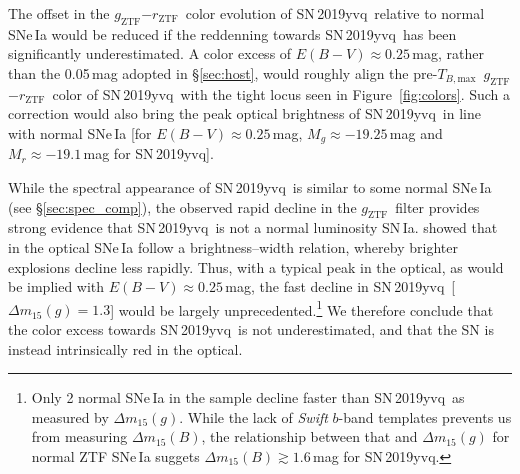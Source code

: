 \documentclass[twocolumn]{aastex63}
\newcommand{\fromkate}[1]{{\color{brown} fromKM: {#1}}}
\newcommand{\frommb}[1]{{\color{purple} fromMB: {#1}}}
\newcommand{\rztf}{$r_\mathrm{ZTF}$}
\newcommand{\gztf}{$g_\mathrm{ZTF}$}
\newcommand{\tbmax}{$T_{B,\mathrm{max}}$}
\newcommand{\sn}{SN\,2019yvq}
\begin{document}
The offset in the \gztf$ - $\rztf\ color evolution of \sn\ relative to normal
SNe\,Ia would be reduced if the reddenning towards \sn\ has been significantly
underestimated. A color excess of $E(B-V) \approx 0.25$\,mag, rather than the
0.05\,mag adopted in \S\ref{sec:host}, would roughly align the pre-\tbmax\
\gztf$ - $\rztf\ color of \sn\ with the tight locus seen in
Figure~\ref{fig:colors}. Such a correction would also bring the peak optical
brightness of \sn\ in line with normal SNe\,Ia [for $E(B-V) \approx
0.25$\,mag, $M_g \approx -19.25$\,mag and $M_r \approx -19.1$\,mag for \sn].

While the spectral appearance of \sn\ is similar to some normal SNe\,Ia (see
\S\ref{sec:spec_comp}), the observed rapid decline in the \gztf\ filter
provides strong evidence that \sn\ is not a normal luminosity SN\,Ia.
\citet{Phillips93} showed that in the optical SNe\,Ia follow a
brightness--width relation, whereby brighter explosions decline less rapidly.
Thus, with a typical peak in the optical, as would be implied with $E(B-V)
\approx 0.25$\,mag, the fast decline in \sn\ [$\Delta m_{15}(g) = 1.3$] would
be largely unprecedented.\footnote{Only 2 normal SNe\,Ia in the \citet{Yao19}
sample decline faster than \sn\ as measured by $\Delta m_{15}(g)$. While the
lack of \textit{Swift} $b$-band templates prevents us from measuring $\Delta
m_{15}(B)$, the relationship between that and $\Delta m_{15}(g)$ for normal
ZTF SNe\,Ia suggets $\Delta m_{15}(B) \gtrsim 1.6$\,mag for \sn.} We therefore
conclude that the color excess towards \sn\ is not underestimated, and that
the SN is instead intrinsically red in the optical.


\end{document}
